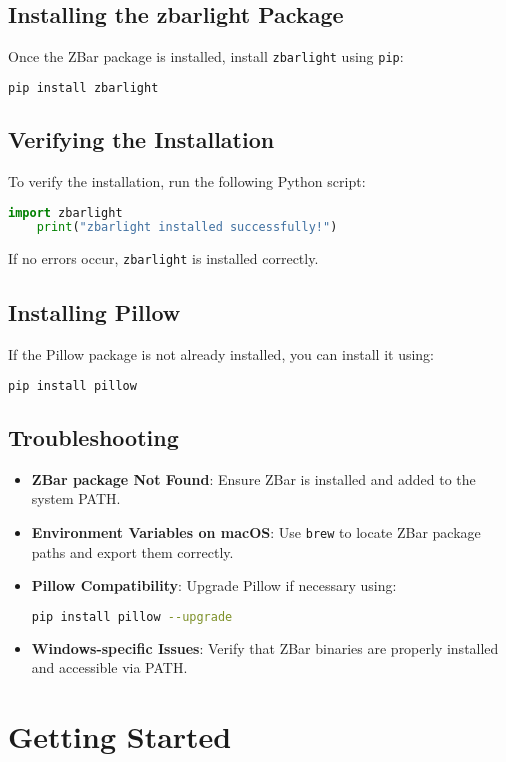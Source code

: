 \subsection{Installing the zbarlight Package}
Once the ZBar package is installed, install \texttt{zbarlight} using \texttt{pip}:
\begin{lstlisting}[language=bash]
	pip install zbarlight
\end{lstlisting}

\subsection{Verifying the Installation}
To verify the installation, run the following Python script:
\begin{lstlisting}[language=Python]
	import zbarlight
	print("zbarlight installed successfully!")
\end{lstlisting}
If no errors occur, \texttt{zbarlight} is installed correctly.

\subsection{Installing Pillow}
If the Pillow package is not already installed, you can install it using:
\begin{lstlisting}[language=bash]
	pip install pillow
\end{lstlisting}

\subsection{Troubleshooting}
\begin{itemize}
	\item \textbf{ZBar package Not Found}: Ensure ZBar is installed and added to the system PATH.
	\item \textbf{Environment Variables on macOS}: Use \texttt{brew} to locate ZBar package paths and export them correctly.
	\item \textbf{Pillow Compatibility}: Upgrade Pillow if necessary using:
	\begin{lstlisting}[language=bash]
		pip install pillow --upgrade
	\end{lstlisting}
	\item \textbf{Windows-specific Issues}: Verify that ZBar binaries are properly installed and accessible via PATH.
\end{itemize}


\section{Getting Started}

